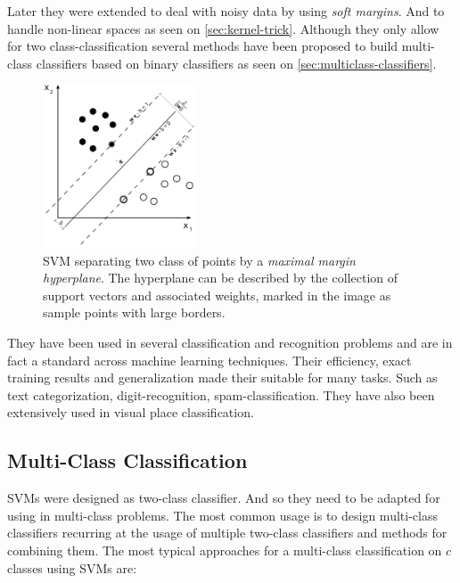 Later they were extended to deal with noisy data by using \emph{soft margins}.
And to handle non-linear spaces as seen on \autoref{sec:kernel-trick}.
Although they only allow for two class-classification several methods have been
proposed to build multi-class classifiers based on binary classifiers as seen on
\autoref{sec:multiclass-classifiers}.

\begin{figure}[h]
\begin{center}
\includegraphics[width=0.4\textwidth]{figures/Svm_max_sep_hyperplane_with_margin}
\end{center}
\caption{{SVM} separating two class of points by a
         \emph{maximal margin hyperplane}. The hyperplane can be described by
         the collection of support vectors and associated weights, marked in the
         image as sample points with large borders.}
\label{fig:svm-sample}
\end{figure}

They have been used in several classification and recognition problems and are
in fact a standard across machine learning techniques. Their efficiency, exact
training results and generalization made their suitable for many tasks. Such as
text categorization, digit-recognition, spam-classification.
They have also been extensively used in visual place classification.


\subsection{Multi-Class Classification}
\label{sec:multiclass-classifiers}
\Glspl{SVM} were designed as two-class classifier. And so they need to be
adapted for using in multi-class problems. The most common usage is to design
multi-class classifiers recurring at the usage of multiple two-class classifiers
and methods for combining them. The most typical approaches for a multi-class
classification on $c$ classes using \glspl{SVM} are:

